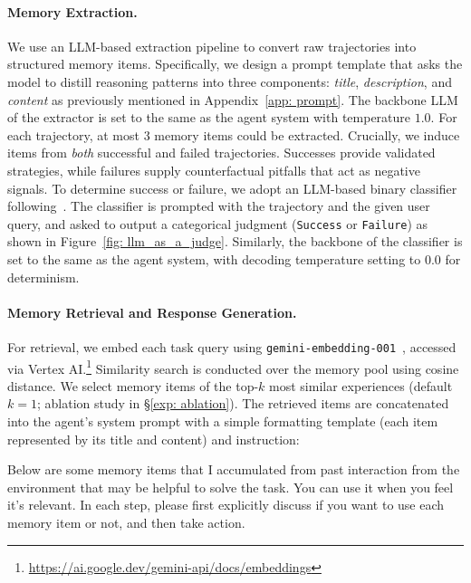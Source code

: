 \paragraph{Memory Extraction.}
We use an LLM-based extraction pipeline to convert raw trajectories into structured memory items.
Specifically, we design a prompt template that asks the model to distill reasoning patterns into three components: \textit{title}, \textit{description}, and \textit{content} as previously mentioned in Appendix~\ref{app: prompt}. 
The backbone LLM of the extractor is set to the same as the agent system with temperature $1.0$.
For each trajectory, at most $3$ memory items could be extracted. 
Crucially, we induce items from \emph{both} successful and failed trajectories. 
Successes provide validated strategies, while failures supply counterfactual pitfalls that act as negative signals. 
To determine success or failure, we adopt an LLM-based binary classifier following~\citep{pan2024autonomous, wang2025agent}. 
The classifier is prompted with the trajectory and the given user query, and asked to output a categorical judgment (\texttt{Success} or \texttt{Failure}) as shown in Figure~\ref{fig: llm_as_a_judge}. Similarly, the backbone of the classifier is set to the same as the agent system, with decoding temperature setting to $0.0$ for determinism. 


\paragraph{Memory Retrieval and Response Generation.} 
For retrieval, we embed each task query using \texttt{gemini-embedding-001}~\citep{lee2025gemini}, accessed via Vertex AI.\footnote{\url{https://ai.google.dev/gemini-api/docs/embeddings}} 
Similarity search is conducted over the memory pool using cosine distance. 
We select memory items of the top-$k$ most similar experiences (default $k=1$; ablation study in \S\ref{exp: ablation}). 
The retrieved items are concatenated into the agent’s system prompt with a simple formatting template (each item represented by its title and content) and instruction:

\begin{mdframed}
Below are some memory items that I accumulated from past interaction from the environment that may be helpful to solve the task. You can use it when you feel it's relevant. In each step, please first explicitly discuss if you want to use each memory item or not, and then take action.
\end{mdframed}



